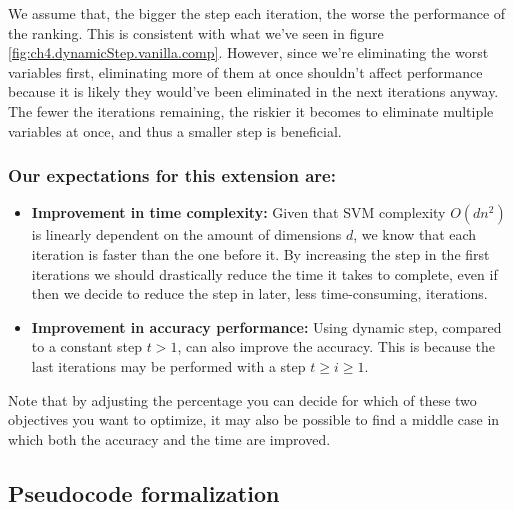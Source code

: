 We assume that, the bigger the step each iteration, the worse the performance of the ranking. This is consistent with what we've seen in figure \ref{fig:ch4.dynamicStep.vanilla.comp}. However, since we're eliminating the worst variables first, eliminating more of them at once shouldn't affect performance because it is likely they would've been eliminated in the next iterations anyway. The fewer the iterations remaining, the riskier it becomes to eliminate multiple variables at once, and thus a smaller step is beneficial.

\subsubsection*{Our expectations for this extension are:}

\begin{itemize}
    \item \textbf{Improvement in time complexity:} Given that SVM complexity $O(dn^2)$ is lin\-ear\-ly dependent on the amount of dimensions $d$, we know that each iteration is faster than the one before it. By increasing the step in the first iterations we should drastically reduce the time it takes to complete, even if then we decide to reduce the step in later, less time-consuming, iterations.
    \item \textbf{Improvement in accuracy performance:} Using dynamic step, compared to a constant step $t > 1$, can also improve the accuracy. This is because the last iterations may be performed with a step $t \ge i \ge 1$.
\end{itemize}

Note that by adjusting the percentage you can decide for which of these two objectives you want to optimize, it may also be possible to find a middle case in which both the accuracy and the time are improved.

\subsection{Pseudocode formalization}

